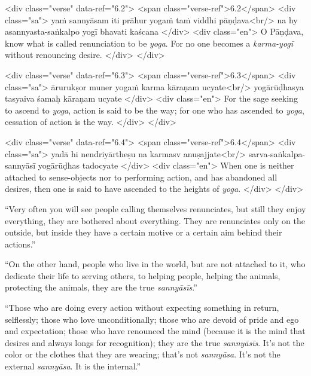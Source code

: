 \begin{html}
<div class="verse" data-ref="6.2">
  <span class="verse-ref">6.2</span>
  <div class="sa">
    yaṁ sannyāsam iti prāhur yogaṁ taṁ viddhi pāṇḍava<br/>
    na hy asannyasta-saṅkalpo yogī bhavati kaścana
  </div>
  <div class="en">
    O Pāṇḍava, know what is called renunciation to be \textit{yoga}. For no one becomes a \textit{karma-yogī} without renouncing desire.
  </div>
</div>
\end{html}



\begin{html}
<div class="verse" data-ref="6.3">
  <span class="verse-ref">6.3</span>
  <div class="sa">
    ārurukṣor muner yogaṁ karma kāraṇam ucyate<br/>
    yogārūḍhasya tasyaiva śamaḥ kāraṇam ucyate
  </div>
  <div class="en">
    For the sage seeking to ascend to \textit{yoga}, action is said to be the way; for one who has ascended to \textit{yoga}, cessation of action is the way.
  </div>
</div>
\end{html}



\begin{html}
<div class="verse" data-ref="6.4">
  <span class="verse-ref">6.4</span>
  <div class="sa">
    yadā hi nendriyārtheṣu na karmasv anuṣajjate<br/>
    sarva-saṅkalpa-sannyāsī yogārūḍhas tadocyate
  </div>
  <div class="en">
    When one is neither attached to sense-objects nor to performing action, and has abandoned all desires, then one is said to have ascended to the heights of \textit{yoga}.
  </div>
</div>
\end{html}


\enquote{Very often you will see people calling themselves renunciates, but still they enjoy everything, they are bothered about everything. They are renunciates only on the outside, but inside they have a certain motive or a certain aim behind their actions.}

\enquote{On the other hand, people who live in the world, but are not attached to it, who dedicate their life to serving others, to helping people, helping the animals, protecting the animals, they are the true \textit{sannyāsīs}.}

\enquote{Those who are doing every action without expecting something in return, selflessly; those who love unconditionally; those who are devoid of pride and ego and expectation; those who have renounced the mind (because it is the mind that desires and always longs for recognition); they are the true \textit{sannyāsīs}. It's not the color or the clothes that they are wearing; that’s not \textit{sannyāsa}. It’s not the external \textit{sannyāsa}. It is the internal.}

